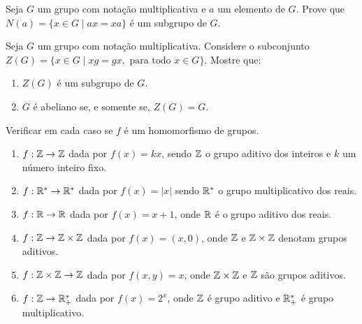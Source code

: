 \documentclass[12pt]{article}
\begin{document}


\vesp

\questao{} Seja $G$ um grupo com nota\c{c}\~ao multiplicativa e $a$ um elemento de $G$. Prove que $N(a) = \{x \in G \mid ax = xa\}$ \'e um subgrupo de $G$.

\vesp

\questao{} Seja $G$ um grupo com nota\c{c}\~ao multiplicativa. Considere o subconjunto $Z(G) = \{x \in G \mid xg = gx, \mbox{ para todo } x \in G\}$. Mostre que:
\begin{enumerate}[label=({\alph*})]
	\item $Z(G)$ \'e um subgrupo de $G$.
	\item $G$ \'e abeliano se, e somente se, $Z(G) = G$.
\end{enumerate}

\vesp

\questao{} Verificar em cada caso se $f$ \'e um homomorfismo de grupos.
\begin{enumerate}[label=({\alph*})]
	\item $f: \mathbb{Z} \to \mathbb{Z}$ dada por $f(x) = kx$, sendo $\mathbb{Z}$ o grupo aditivo dos inteiros e $k$ um n\'umero inteiro fixo.
	\item $f: \mathbb{R}^* \to \mathbb{R}^*$ dada por $f(x) = |x|$ sendo $\mathbb{R}^*$ o grupo multiplicativo dos reais.
	\item $f: \mathbb{R} \to \mathbb{R}$ dada por $f(x) = x + 1$, onde $\mathbb{R}$ \'e o grupo aditivo dos reais.
	\item $f: \mathbb{Z} \to \mathbb{Z} \times \mathbb{Z}$ dada por $f(x) = (x, 0)$, onde $\mathbb{Z}$ e $\mathbb{Z} \times \mathbb{Z}$ denotam grupos aditivos.
	\item $f: \mathbb{Z} \times \mathbb{Z} \to \mathbb{Z}$ dada por $f(x,y) = x$, onde $\mathbb{Z} \times \mathbb{Z}$ e $\mathbb{Z}$ s\~ao grupos aditivos.
	\item $f: \mathbb{Z} \to \mathbb{R}^*_+$ dada por $f(x) = 2^x$, onde $\mathbb{Z}$ \'e grupo aditivo e $\mathbb{R}^*_+$ \'e grupo multiplicativo.
\end{enumerate}
\end{document}

